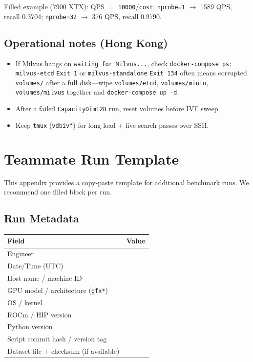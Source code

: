 \documentclass[11pt,a4paper]{article}
\begin{document}
Filled example (7900 XTX): QPS $=$ \texttt{10000}/\texttt{cost};
\texttt{nprobe=1} $\rightarrow$ 1589 QPS, recall 0.3704; \texttt{nprobe=32} $\rightarrow$
376 QPS, recall 0.9790.

\subsection{Operational notes (Hong Kong)}

\begin{itemize}[leftmargin=*]
  \item If Milvus hangs on \texttt{waiting for Milvus...}, check \texttt{docker-compose ps};
        \texttt{milvus-etcd} \texttt{Exit~1} or \texttt{milvus-standalone} \texttt{Exit~134}
        often means corrupted \texttt{volumes/} after a full disk---wipe
        \texttt{volumes/etcd}, \texttt{volumes/minio}, \texttt{volumes/milvus} together and
        \texttt{docker-compose up -d}.
  \item After a failed \texttt{CapacityDim128} run, reset volumes before IVF sweep.
  \item Keep \texttt{tmux} (\texttt{vdbivf}) for long load + five search passes over SSH.
\end{itemize}

\appendix
\section{Teammate Run Template}
\label{app:teammate-template}

This appendix provides a copy-paste template for additional benchmark runs.
We recommend one filled block per run.

\subsection*{Run Metadata}
\begin{tabularx}{\textwidth}{@{}>{\raggedright\arraybackslash}p{}X@{}}
\toprule
\textbf{Field} & \textbf{Value} \\
\midrule
Engineer & \\
Date/Time (UTC) & \\
Host name / machine ID & \\
GPU model / architecture (\texttt{gfx*}) & \\
OS / kernel & \\
ROCm / HIP version & \\
Python version & \\
Script commit hash / version tag & \\
Dataset file + checksum (if available) & \\
\bottomrule
\end{tabularx}
\end{document}
